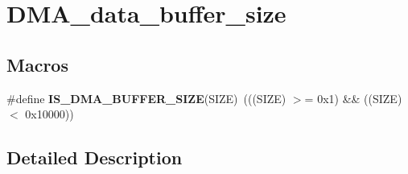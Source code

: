 \hypertarget{group___d_m_a__data__buffer__size}{\section{D\-M\-A\-\_\-data\-\_\-buffer\-\_\-size}
\label{group___d_m_a__data__buffer__size}
}
\subsection*{Macros}
\begin{DoxyCompactItemize}
\item 
\hypertarget{group___d_m_a__data__buffer__size_ga72ef4033bb3bc2cdfdbe579083b05e32}{\#define {\bfseries I\-S\-\_\-\-D\-M\-A\-\_\-\-B\-U\-F\-F\-E\-R\-\_\-\-S\-I\-Z\-E}(S\-I\-Z\-E)~(((S\-I\-Z\-E) $>$= 0x1) \&\& ((\-S\-I\-Z\-E) $<$ 0x10000))}\label{group___d_m_a__data__buffer__size_ga72ef4033bb3bc2cdfdbe579083b05e32}

\end{DoxyCompactItemize}


\subsection{Detailed Description}
